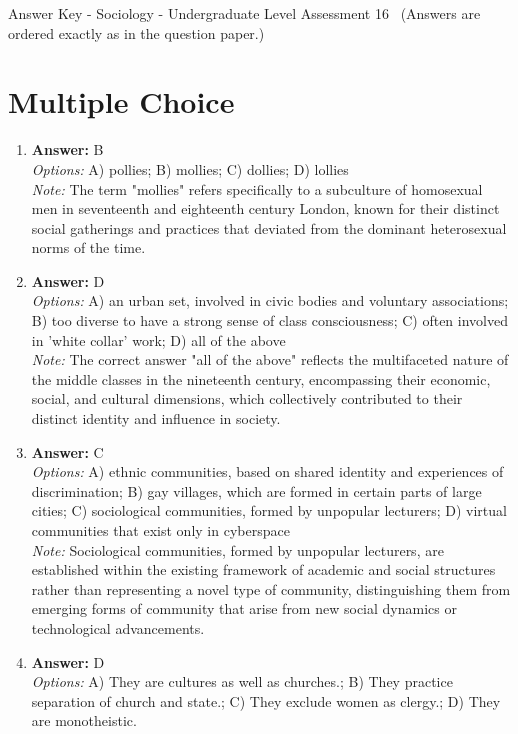 \documentclass[12pt]{article}
\begin{document}
\begin{center}
Answer Key - Sociology - Undergraduate Level Assessment 16 \
\small (Answers are ordered exactly as in the question paper.)
\end{center}

\section*{Multiple Choice}
\begin{enumerate}[label=\arabic*.]
\item \textbf{Answer:} B
\\ \textit{Options:} A) pollies; B) mollies; C) dollies; D) lollies
\\ \textit{Note:} The term "mollies" refers specifically to a subculture of homosexual men in seventeenth and eighteenth century London, known for their distinct social gatherings and practices that deviated from the dominant heterosexual norms of the time.
\item \textbf{Answer:} D
\\ \textit{Options:} A) an urban set, involved in civic bodies and voluntary associations; B) too diverse to have a strong sense of class consciousness; C) often involved in 'white collar' work; D) all of the above
\\ \textit{Note:} The correct answer "all of the above" reflects the multifaceted nature of the middle classes in the nineteenth century, encompassing their economic, social, and cultural dimensions, which collectively contributed to their distinct identity and influence in society.
\item \textbf{Answer:} C
\\ \textit{Options:} A) ethnic communities, based on shared identity and experiences of discrimination; B) gay villages, which are formed in certain parts of large cities; C) sociological communities, formed by unpopular lecturers; D) virtual communities that exist only in cyberspace
\\ \textit{Note:} Sociological communities, formed by unpopular lecturers, are established within the existing framework of academic and social structures rather than representing a novel type of community, distinguishing them from emerging forms of community that arise from new social dynamics or technological advancements.
\item \textbf{Answer:} D
\\ \textit{Options:} A) They are cultures as well as churches.; B) They practice separation of church and state.; C) They exclude women as clergy.; D) They are monotheistic.

\end{enumerate}
\end{document}
